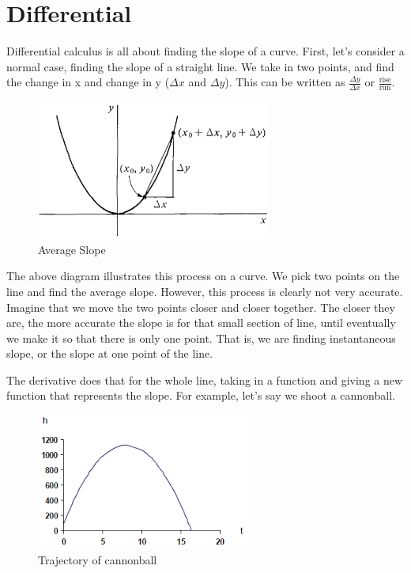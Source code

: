 \documentclass[12pt]{article}
\begin{document}
\section{Differential}

Differential calculus is all about finding the slope of a curve. First, let's consider a normal case, finding the slope of a straight line. We take in two points, and find the change in x and change in y ($\Delta x$ and $\Delta y$). This can be written as $\frac{\Delta y}{\Delta x}$ or $\frac{\text{rise}}{\text{run}}$.

\begin{figure}[H]
\caption{Average Slope}
\includegraphics[scale=1]{download.png}
\end{figure}

The above diagram illustrates this process on a curve. We pick two points on the line and find the average slope. However, this process is clearly not very accurate. Imagine that we move the two points closer and closer together. The closer they are, the more accurate the slope is for that small section of line, until eventually we make it so that there is only one point. That is, we are finding instantaneous slope, or the slope at one point of the line.

The derivative does that for the whole line, taking in a function and giving a new function that represents the slope. For example, let's say we shoot a cannonball.

\begin{figure}[H]
\caption{Trajectory of cannonball}
\includegraphics[scale=1]{imgres.png}
\end{figure}
\end{document}
